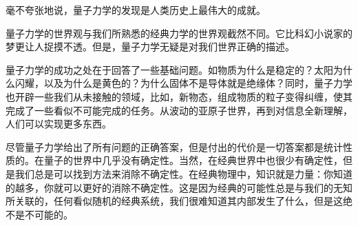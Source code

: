 毫不夸张地说，量子力学的发现是人类历史上最伟大的成就。\par
量子力学的世界观与我们所熟悉的经典力学的世界观截然不同。它比科幻小说家的梦更让人捉摸不透。但是，量子力学无疑是对我们世界正确的描述。\par
量子力学的成功之处在于回答了一些基础问题。如物质为什么是稳定的？太阳为什么闪耀，以及为什么是黄色的？为什么固体不是导体就是绝缘体？同时，量子力学也开辟一些我们从未接触的领域，比如，新物态，组成物质的粒子变得纠缠，使其完成了一些看似不可能完成的任务。从波动的亚原子世界，再到对信息全新理解，人们可以实现更多东西。\par
尽管量子力学给出了所有问题的正确答案，但是付出的代价是一切答案都是统计性质的。在量子的世界中几乎没有确定性。当然，在经典世界中也很少有确定性，但是我们总是可以找到方法来消除不确定性。在经典物理中，知识就是力量：你知道的越多，你就可以更好的消除不确定性。这是因为经典的可能性总是与我们的无知所关联的，任何看似随机的经典系统，我们很难知道其内部发生了什么，但是这绝不是不可能的。\par
